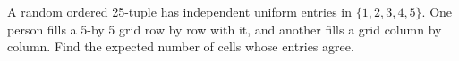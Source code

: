 A random ordered 25-tuple has independent uniform entries in $\{1,2,3,4,5\}$. One person fills a 5-by 5 grid row by row with it, and another fills a grid column by column. Find the expected number of cells whose entries agree.
